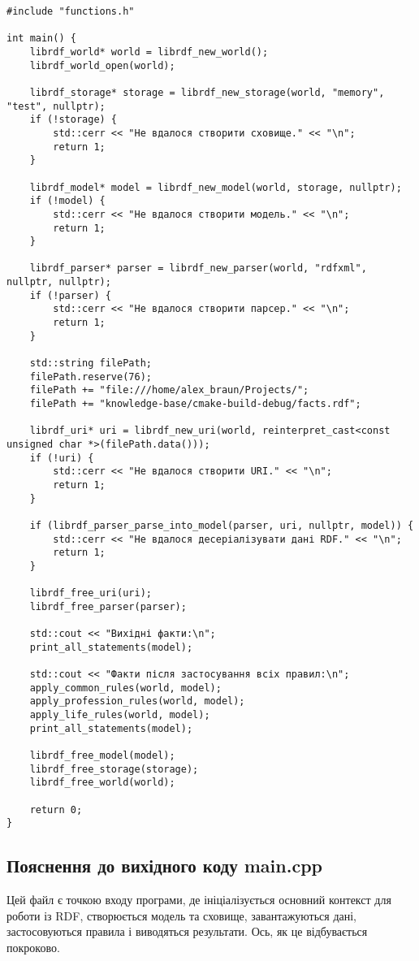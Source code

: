 \documentclass[12pt, a4paper]{article}
\begin{document}
\begin{verbatim}
#include "functions.h"

int main() {
    librdf_world* world = librdf_new_world();
    librdf_world_open(world);

    librdf_storage* storage = librdf_new_storage(world, "memory", "test", nullptr);
    if (!storage) {
        std::cerr << "Не вдалося створити сховище." << "\n";
        return 1;
    }

    librdf_model* model = librdf_new_model(world, storage, nullptr);
    if (!model) {
        std::cerr << "Не вдалося створити модель." << "\n";
        return 1;
    }

    librdf_parser* parser = librdf_new_parser(world, "rdfxml", nullptr, nullptr);
    if (!parser) {
        std::cerr << "Не вдалося створити парсер." << "\n";
        return 1;
    }

    std::string filePath;
    filePath.reserve(76);
    filePath += "file:///home/alex_braun/Projects/";
    filePath += "knowledge-base/cmake-build-debug/facts.rdf";

    librdf_uri* uri = librdf_new_uri(world, reinterpret_cast<const unsigned char *>(filePath.data()));
    if (!uri) {
        std::cerr << "Не вдалося створити URI." << "\n";
        return 1;
    }

    if (librdf_parser_parse_into_model(parser, uri, nullptr, model)) {
        std::cerr << "Не вдалося десеріалізувати дані RDF." << "\n";
        return 1;
    }

    librdf_free_uri(uri);
    librdf_free_parser(parser);

    std::cout << "Вихідні факти:\n";
    print_all_statements(model);

    std::cout << "Факти після застосування всіх правил:\n";
    apply_common_rules(world, model);
    apply_profession_rules(world, model);
    apply_life_rules(world, model);
    print_all_statements(model);

    librdf_free_model(model);
    librdf_free_storage(storage);
    librdf_free_world(world);

    return 0;
}
\end{verbatim}

\subsection{Пояснення до вихідного коду main.cpp}

Цей файл є точкою входу програми, де ініціалізується основний контекст для роботи із RDF, створюється модель та сховище, завантажуються дані, застосовуються правила і виводяться результати. Ось, як це відбувається покроково.
\end{document}
